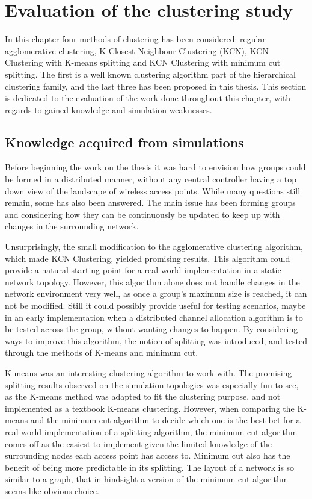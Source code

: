 \section{Evaluation of the clustering study}
In this chapter four methods of clustering has been considered: regular agglomerative clustering, K-Closest Neighbour Clustering (KCN), KCN Clustering with K-means splitting
and KCN Clustering with minimum cut splitting. The first is a well known clustering algorithm part of the hierarchical clustering family, and the last three has been proposed in this thesis. 
This section is dedicated to the evaluation of the work done throughout this chapter, with regards to gained knowledge and simulation weaknesses.

\subsection{Knowledge acquired from simulations}
Before beginning the work on the thesis it was hard to envision how groups could be formed in a distributed manner, without any central controller having a top down view of
the landscape of wireless access points. While many questions still remain, some has also been answered. The main issue
has been forming groups and considering how they can be continuously be updated to keep up with changes in the surrounding network.  

Unsurprisingly, the small modification to the agglomerative clustering algorithm, which made KCN Clustering, yielded promising results.
This algorithm could provide a natural starting point for a real-world implementation in a static network topology.
However, this algorithm alone does not handle changes in the network environment very well, as once a group's maximum size is reached, it can not be modified. 
Still it could possibly provide useful for testing scenarios, maybe in an early implementation when a distributed channel allocation algorithm is to be tested across the group, without
wanting changes to happen. By considering ways to improve this algorithm, the notion of splitting was introduced, and tested through the methods of K-means and minimum cut.

K-means was an interesting clustering algorithm to work with. The promising splitting results observed on the simulation topologies was especially fun to see, as
the K-means method was adapted to fit the clustering purpose, and not implemented as a textbook K-means clustering.
However, when comparing the K-means and the minimum cut algorithm to decide which one is the best bet for a real-world implementation of a splitting algorithm,
the minimum cut algorithm comes off as the easiest to implement given the limited knowledge of the surrounding nodes each access point has access to. 
Minimum cut also has the benefit of being more predictable in its splitting. The layout of a network is so similar to a graph,
that in hindsight a version of the minimum cut algorithm seems like obvious choice. 

